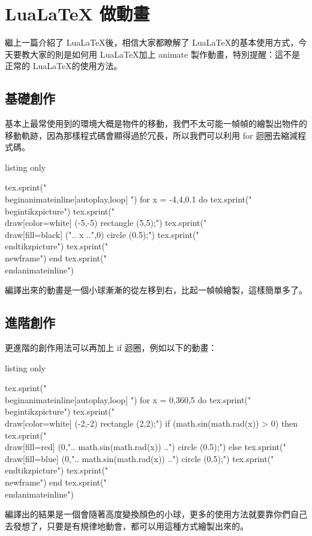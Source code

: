 \chapter{LuaLaTeX 做動畫}

繼上一篇介紹了 Lua\LaTeX 後，相信大家都瞭解了 Lua\LaTeX 的基本使用方式，今天要教大家的則是如何用 Lua\LaTeX 加上 animate 製作動畫，特別提醒：這不是正常的 Lua\LaTeX 的使用方法。

\section{基礎創作}

基本上最常使用到的環境大概是物件的移動，我們不太可能一幀幀的繪製出物件的移動軌跡，因為那樣程式碼會顯得過於冗長，所以我們可以利用 for 迴圈去縮減程式碼。

\begin{tcblisting}{listing only}
\begin{luacode}
tex.sprint("\\begin{animateinline}[autoplay,loop]{10}")
for x = -4,4,0.1 do
	tex.sprint("\\begin{tikzpicture}")
	tex.sprint("\\draw[color=white] (-5,-5) rectangle (5,5);")
	tex.sprint("\\draw[fill=black] (".. x ..",0) circle (0.5);")
	tex.sprint("\\end{tikzpicture}")
	tex.sprint("\\newframe")
end
tex.sprint("\\end{animateinline}")
\end{luacode}
\end{tcblisting}

編譯出來的動畫是一個小球漸漸的從左移到右，比起一幀幀繪製，這樣簡單多了。

\section{進階創作}

更進階的創作用法可以再加上 if 迴圈，例如以下的動畫：

\begin{tcblisting}{listing only}
\begin{luacode}
tex.sprint("\\begin{animateinline}[autoplay,loop]{10}")
for x = 0,360,5 do
	tex.sprint("\\begin{tikzpicture}")
	tex.sprint("\\draw[color=white] (-2,-2) rectangle (2,2);")
	if (math.sin(math.rad(x)) > 0) then
		tex.sprint("\\draw[fill=red] (0,".. math.sin(math.rad(x)) ..") circle (0.5);")
	else
		tex.sprint("\\draw[fill=blue] (0,".. math.sin(math.rad(x)) ..") circle (0.5);")
	tex.sprint("\\end{tikzpicture}")
	tex.sprint("\\newframe")
end
tex.sprint("\\end{animateinline}")
\end{luacode}
\end{tcblisting}

編譯出的結果是一個會隨著高度變換顏色的小球，更多的使用方法就要靠你們自己去發想了，只要是有規律地動會，都可以用這種方式繪製出來的。